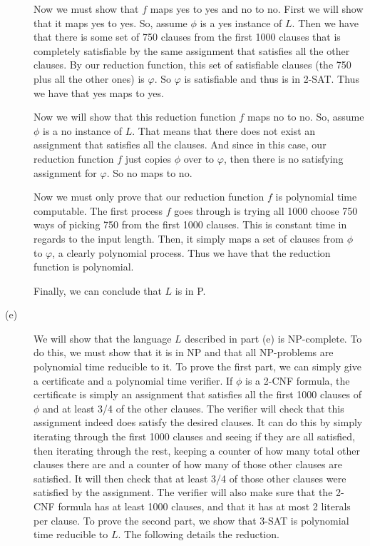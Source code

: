 \documentclass{article}
\begin{document}
\begin{description}
        Now we must show that $f$ maps yes to yes and no to no. First we will
        show that it maps yes to yes. So, assume $\phi$ is a yes instance
        of $L$. Then we have that there is some set of 750 clauses from the
        first 1000 clauses that is completely satisfiable by the same assignment
        that satisfies all the other clauses. By our reduction function, this
        set of satisfiable clauses (the 750 plus all the other ones)
        is $\varphi$. So $\varphi$ is satisfiable
        and thus is in 2-SAT. Thus we have that yes maps to yes.

        Now we will show that this reduction function $f$ maps no to no. So,
        assume $\phi$ is a no instance of $L$. That means that there does
        not exist an assignment that satisfies all the clauses. And since
        in this case, our reduction function $f$ just copies $\phi$ over to
        $\varphi$, then there is no satisfying assignment for $\varphi$. So
        no maps to no.

        Now we must only prove that our reduction function $f$ is polynomial
        time computable. The first process $f$ goes through is trying all
        1000 choose 750 ways of picking 750 from the first 1000 clauses. This
        is constant time in regards to the input length. Then, it simply maps
        a set of clauses from $\phi$ to $\varphi$, a clearly polynomial
        process. Thus we have that the reduction function is polynomial.

        Finally, we can conclude that $L$ is in P.
    \item[(e)]
        We will show that the language $L$ described in part (e) is NP-complete.
        To do this, we must show that it is in NP and that all NP-problems
        are polynomial time reducible to it. To prove the first part, we can
        simply give a certificate and a polynomial time verifier.
        If $\phi$ is a 2-CNF formula, the
        certificate is simply an assignment that satisfies all the first
        1000 clauses of $\phi$ and at least 3/4 of the other clauses. The
        verifier will check that this assignment indeed does satisfy the
        desired clauses. It can do this by simply iterating through the first
        1000 clauses and seeing if they are all satisfied, then iterating
        through the rest, keeping a counter of how many total other clauses
        there are and a counter of how many of those other clauses are
        satisfied. It will then check that at least 3/4 of those other clauses
        were satisfied by the assignment. The verifier will also make sure
        that the 2-CNF formula has at least 1000 clauses, and that it has
        at most 2 literals per clause. To prove the second part, we show that
        3-SAT is polynomial time reducible to $L$. The following details the
        reduction.

\end{description}
\newpage
\end{document}
